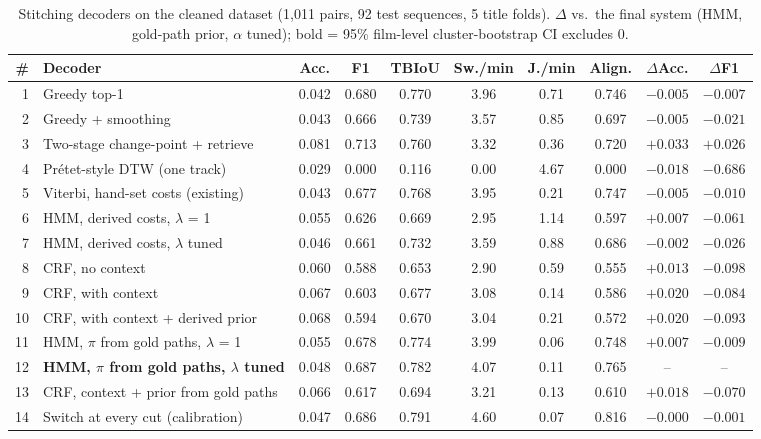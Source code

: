 \begin{table}[t]
\centering
\small
\caption{Stitching decoders on the cleaned dataset (1{,}011 pairs, 92 test sequences, 5 title folds). $\Delta$ vs.\ the final system (HMM, gold-path prior, $\alpha$ tuned); bold = 95\% film-level cluster-bootstrap CI excludes 0.}
\label{tab:supp_stitch_cleaned}
\begin{tabular}{@{}rlcccccccc@{}}
\toprule
\# & Decoder & Acc. & F1 & TBIoU & Sw./min & J./min & Align. & $\Delta$Acc. & $\Delta$F1 \\
\midrule
1 & Greedy top-1 & 0.042 & 0.680 & 0.770 & 3.96 & 0.71 & 0.746 & $-0.005$ & $-0.007$ \\
2 & Greedy + smoothing & 0.043 & 0.666 & 0.739 & 3.57 & 0.85 & 0.697 & $-0.005$ & $\mathbf{-0.021}$ \\
3 & Two-stage change-point + retrieve & 0.081 & 0.713 & 0.760 & 3.32 & 0.36 & 0.720 & $\mathbf{+0.033}$ & $+0.026$ \\
4 & Pr\'etet-style DTW (one track) & 0.029 & 0.000 & 0.116 & 0.00 & 4.67 & 0.000 & $-0.018$ & $\mathbf{-0.686}$ \\
5 & Viterbi, hand-set costs (existing) & 0.043 & 0.677 & 0.768 & 3.95 & 0.21 & 0.747 & $-0.005$ & $-0.010$ \\
6 & HMM, derived costs, $\lambda$ = 1 & 0.055 & 0.626 & 0.669 & 2.95 & 1.14 & 0.597 & $+0.007$ & $\mathbf{-0.061}$ \\
7 & HMM, derived costs, $\lambda$ tuned & 0.046 & 0.661 & 0.732 & 3.59 & 0.88 & 0.686 & $-0.002$ & $-0.026$ \\
8 & CRF, no context & 0.060 & 0.588 & 0.653 & 2.90 & 0.59 & 0.555 & $\mathbf{+0.013}$ & $\mathbf{-0.098}$ \\
9 & CRF, with context & 0.067 & 0.603 & 0.677 & 3.08 & 0.14 & 0.586 & $\mathbf{+0.020}$ & $\mathbf{-0.084}$ \\
10 & CRF, with context + derived prior & 0.068 & 0.594 & 0.670 & 3.04 & 0.21 & 0.572 & $\mathbf{+0.020}$ & $\mathbf{-0.093}$ \\
11 & HMM, $\pi$ from gold paths, $\lambda$ = 1 & 0.055 & 0.678 & 0.774 & 3.99 & 0.06 & 0.748 & $\mathbf{+0.007}$ & $-0.009$ \\
12 & \textbf{HMM, $\pi$ from gold paths, $\lambda$ tuned} & 0.048 & 0.687 & 0.782 & 4.07 & 0.11 & 0.765 & -- & -- \\
13 & CRF, context + prior from gold paths & 0.066 & 0.617 & 0.694 & 3.21 & 0.13 & 0.610 & $\mathbf{+0.018}$ & $\mathbf{-0.070}$ \\
14 & Switch at every cut (calibration) & 0.047 & 0.686 & 0.791 & 4.60 & 0.07 & 0.816 & $-0.000$ & $-0.001$ \\

\end{tabular}
\end{table}
